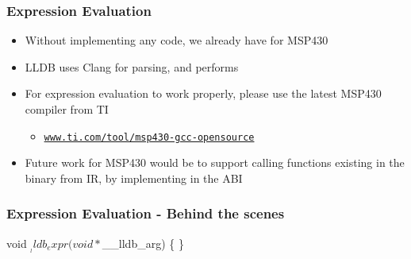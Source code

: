 \begin{frame}[fragile]
\frametitle{Expression Evaluation}
\begin{itemize}
    \item Without implementing any code, we already have  for MSP430
    \item LLDB uses Clang for parsing, and performs 
    \item For expression evaluation to work properly, please use the latest MSP430 compiler from TI
    \begin{itemize}
    \item \href{http://www.ti.com/tool/msp430-gcc-opensource}{\nolinkurl{www.ti.com/tool/msp430-gcc-opensource}}
    \end{itemize}
    \item Future work for MSP430 would be to support calling functions existing in the binary from IR, by implementing  in the ABI
\end{itemize}
\end{frame}

\begin{frame}[fragile]
\frametitle{Expression Evaluation - Behind the scenes}
    \begin{codebox2}
void $__lldb_expr(void *$__lldb_arg) 
\{ 
\}
    \end{codebox2}
\end{frame}


